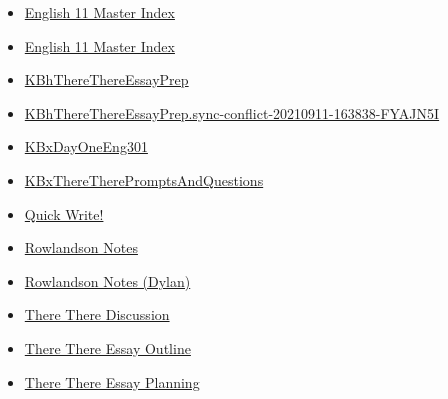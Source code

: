 \documentclass[11pt]{article}
\begin{document}
\begin{itemize}
\begin{itemize}
\begin{itemize}
\item \href{english/english11/KBMasterIndexEng301.org}{English 11 Master Index}
\item \href{english/english11/index.org}{English 11 Master Index}
\item \href{english/english11/KBhThereThereEssayPrep.org}{KBhThereThereEssayPrep}
\item \href{english/english11/KBhThereThereEssayPrep.sync-conflict-20210911-163838-FYAJN5I.org}{KBhThereThereEssayPrep.sync-conflict-20210911-163838-FYAJN5I}
\item \href{english/english11/KBxDayOneEng301.org}{KBxDayOneEng301}
\item \href{english/english11/KBxThereTherePromptsAndQuestions.org}{KBxThereTherePromptsAndQuestions}
\item \href{english/english11/KBxQuickWrite.org}{Quick Write!}
\item \href{english/english11/KBxRowlandson.org}{Rowlandson Notes}
\item \href{english/english11/KBdRowlandson.org}{Rowlandson Notes (Dylan)}
\item \href{english/english11/KBhENG301ThereThereDiscussion.org}{There There Discussion}
\item \href{english/english11/KBdThereThereEssayOutline.org}{There There Essay Outline}
\item \href{english/english11/KBxThereThereEssayPlanning.org}{There There Essay Planning}
\end{itemize}
\end{itemize}
\end{itemize}
\end{document}
